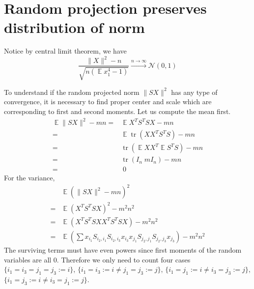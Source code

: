 \documentclass[12pt]{extarticle}
\newcommand{\cN}{{\mathcal{N}}}
\newcommand{\1}{\field{1}}
\DeclareMathOperator{\tr}{tr}
\DeclareMathOperator{\E}{\mathbb{E}}
\numberwithin{equation}{section}
\begin{document}
\section{Random projection preserves distribution of norm}\label{sec:RP  distribution of norm}
Notice by central limit theorem, we have 
\[
\frac{\|X\|^2 - n}{\sqrt{n (\E x_1^4-1)}} \xrightarrow[]{n \to \infty} \cN (0,1)
\]

To understand if the random projected norm $\| SX\|^2$ has any type of convergence, it is necessary to find proper center and scale which are corresponding to first and second moments. Let us compute the mean first.
\begin{align*}
\E \| SX\|^2 -mn 
   = &  \E X^TS^T SX -mn \\
    = & \E \tr(XX^TS^TS) - mn  \\
    = & \tr(\E XX^T \E S^TS) - mn \\
    = & \tr(I_n\; m I_n) - mn \\
    =  & \;0
\end{align*}
For the variance, 
\begin{align*}
 & \E (\| SX\|^2  -mn)^2 \\
 = & \E (X^TS^T SX)^2 -m^2n^2 \\
 = & \E (X^TS^T SXX^TS^T SX) -m^2n^2 \\
    = & \E \left( \sum x_{i_1} S_{i_2,i_1} S_{i_2,i_3} x_{i_3} x_{j_1} S_{j_2,j_1} S_{j_2,j_3} x_{j_3} \right) - m^2n^2 
\end{align*}
The surviving terms must have even powers since first moments of the random variables are all 0. Therefore we only need to count four cases 
$\{i_1=i_3=j_1=j_3:=i\}$, $\{i_1=i_3:=i\neq j_1=j_3:=j\}$, $\{i_1=j_1:=i\neq i_3=j_3:=j\}$, $\{i_1=j_3:=i\neq i_3=j_1:=j\}$.\\
\end{document}
